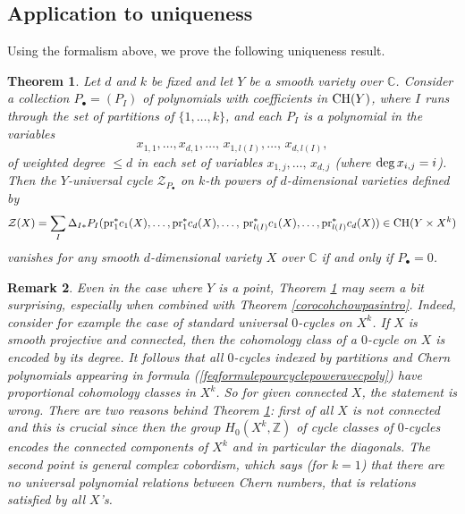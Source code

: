 \documentclass[10pt]{article}
\newtheorem{theo}{Theorem}[section]
\newtheorem{rema}[theo]{Remark}
\begin{document}
 \subsection{Application to uniqueness \label{subsecunique}}
Using the formalism  above, we prove the following uniqueness result.
\begin{theo}\label{propunique} Let $d$ and $k$ be fixed and let $Y$ be a smooth variety over $\mathbb{C}$. Consider
a collection $P_\bullet=(P_I)$ of polynomials with coefficients in ${\rm CH}(Y)$, where $I$ runs through the set of
partitions of $\{1,\ldots,k\}$, and each $P_I$ is a polynomial in the  variables
$$x_{1,1},\ldots, x_{d,1},\ldots,\,x_{1,l(I)},\ldots,\,x_{d,l(I)},$$  of weighted degree $\leq d$ in each set of variables
$x_{1,j},\ldots,\,x_{d,j}$ (where  ${\rm deg}\,x_{i,j}=i$).
Then the $Y$-universal cycle  $\mathcal{Z}_{P_\bullet}$ on $k$-th powers of $d$-dimensional varieties defined by
\begin{eqnarray}\label{eqZPstand}
\mathcal{Z}(X)=\sum_I\Delta_{I*}P_I({\rm pr}_1^*c_{1}(X),\ldots, {\rm pr}_1^*c_{d}(X),\ldots,\,{\rm pr}_{l(I)}^*c_{1}(X),\ldots, {\rm pr}_{l(I)}^*c_{d}(X))\in {\rm CH}(Y\times X^k)
\end{eqnarray}
 vanishes for any smooth $d$-dimensional variety $X$ over $\mathbb{C}$ if and only if $P_\bullet=0$.
\end{theo}
\begin{rema}{\rm Even in the case where $Y$ is a point, Theorem \ref{propunique} may seem a bit surprising, especially when  combined with Theorem \ref{corocohchowpasintro}. Indeed, consider for example the case of standard universal $0$-cycles on $X^k$. If $X$ is smooth projective and connected, then the cohomology class of a $0$-cycle on $X$ is encoded by its degree. It follows that
all $0$-cycles indexed by partitions and Chern polynomials appearing  in formula (\ref{feqformulepourcyclepoweravecpoly}) have proportional cohomology classes in $X^k$. So for given connected $X$, the statement is wrong. There are two reasons  behind Theorem \ref{propunique}: first of all $X$ is not connected and this is crucial since then the group $H_0(X^k,\mathbb{Z})$ of cycle classes of $0$-cycles encodes the connected components of $X^k$ and in particular the diagonals. The second point   is general complex cobordism, which says (for $k=1$) that there are no {\it universal} polynomial relations between Chern numbers, that is  relations satisfied by all $X$'s.  }
\end{rema}
\end{document}

